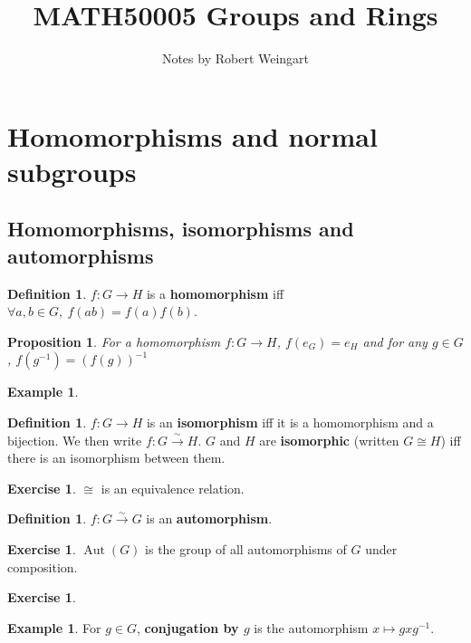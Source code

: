 \documentclass[12pt]{article}
\title{MATH50005 Groups and Rings}
\author{Notes by Robert Weingart}
\date{}
\newtheorem{prop}[thm]{Proposition}
\theoremstyle{definition}
\newtheorem{defn}[thm]{Definition}
\newtheorem{exr}[thm]{Exercise}
\newtheorem{exm}[thm]{Example}
\newcommand{\isoto}{\xrightarrow{\sim}}
\DeclareMathOperator{\Aut}{Aut}
\begin{document}
\maketitle

\tableofcontents

\section{Homomorphisms and normal subgroups}

\subsection{Homomorphisms, isomorphisms and automorphisms}

\begin{defn}
  $f : G \to H$ is a \textbf{homomorphism} iff $\forall a, b \in G,\ f(ab) = f(a)f(b)$.
\end{defn}

\begin{prop}
  For a homomorphism $f : G \to H$, $f(e_G) = e_H$ and for any $g \in G$, $f(g^{-1}) = (f(g))^{-1}$
\end{prop}

\begin{exm}
\end{exm}

\begin{defn}
  $f : G \to H$ is an \textbf{isomorphism} iff it is a homomorphism and a bijection.
  We then write $f : G \isoto H$.
  $G$ and $H$ are \textbf{isomorphic} (written $G \cong H$) iff there is an isomorphism between them.
\end{defn}

\begin{exr}
  $\cong$ is an equivalence relation.
\end{exr}

\begin{defn}
  $f : G \isoto G$ is an \textbf{automorphism}.
\end{defn}

\begin{exr}
  $\Aut(G)$ is the group of all automorphisms of $G$ under composition.
\end{exr}

\begin{exr}
\end{exr}

\begin{exm}
  For $g \in G$, \textbf{conjugation by $g$} is the automorphism $x \mapsto gxg^{-1}$.
\end{exm}
\end{document}
